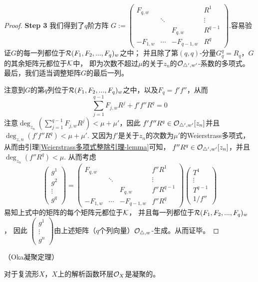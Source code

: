 \begin{proof}
\textbf{Step 3}
我们得到了$q$阶方阵
$
  G:=
    \begin{pmatrix}
    F_{q,w} &  &  & R^1 \\
      & \ddots &   & \vdots \\
      &   & F_{q,w} & R^{q-1} \\
    -F_{1,w} & \cdots & -F_{q-1,w} & R^q
  \end{pmatrix}
$.容易验证$G$的每一列都位于$\mathcal{R}(F_1,F_2,...,F_q)_w$之中；
并且除了第$(q,q)$-分量$G^q_q=R_q$，$G$的其余矩阵元都位于$\mathcal{K}$中，
即为次数不超过$\mu$的关于$z_n$的$\mathcal{O}_{\triangle',w'}$-系数的多项式。
最后，我们适当调整矩阵$G$的最后一列。

注意到$G$的第$q$列位于$\mathcal{R}(F_1,F_2,...,F_q)_w$之中，以及$F_q=f'f''$，从而
$$
  \sum_{j=1}^{q-1}
    F_{j,w}R^j
  + f'f''R^q
=0
$$
注意$\deg_{z_n}\left(
  \sum\limits_{j=1}^{q-1}
    F_{j,w}R^j
\right)<\mu+\mu'$，因此
$f'f''R^q\in\mathcal{O}_{\triangle',w'}[z_n]$并且
$\deg_{z,n}(f'f''R^q)<\mu+\mu'$.
又因为$f'$是关于$z_n$的次数为$\mu'$的Weierstrass多项式，
从而由引理\ref{Weierstrass多项式整除引理-lemma}可知，
$f''R^q\in\mathcal{O}_{\triangle',w'}[z_n]$，并且$\deg_{z_n}(f''R^q)<\mu$.
从而考虑
$$
  \begin{pmatrix}
    g^1 \\
    g^2 \\
    \vdots \\
    g^q
  \end{pmatrix}
=
  \begin{pmatrix}
    F_{q,w} &  &  & f''R^1 \\
      & \ddots &   & \vdots \\
      &   & F_{q,w} & f''R^{q-1} \\
    -F_{1,w} & \cdots & -F_{q-1,w} & f''R^q
  \end{pmatrix}
  \begin{pmatrix}
    T^1 \\
    \vdots \\
    T^{q-1} \\
    1/f''
  \end{pmatrix}
$$
易知上式中的矩阵的每个矩阵元都位于$\mathcal{K}$，
并且每一列都位于$\mathcal{R}(F_1,F_2,...,F_q)_w$，
因此
$
  \begin{pmatrix}
    g^1 \\
    \vdots \\
    g^n
  \end{pmatrix}
$由上述矩阵（$q$个列向量）$\mathcal{O}_{\triangle,w}$-生成。从而证毕。
\end{proof}

\begin{thm}（Oka凝聚定理）

对于复流形$X$，$X$上的解析函数环层$\mathcal{O}_X$是凝聚的。
\end{thm}

